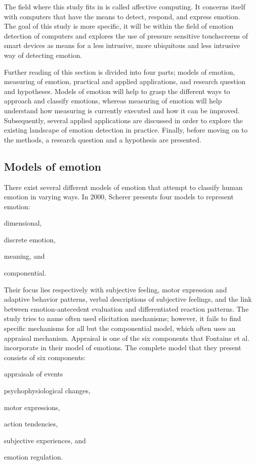 \documentclass{sigchi}
\begin{document}
The field where this study fits in is called affective computing. It concerns itself with computers that have the means to detect, respond, and express emotion. The goal of this study is more specific, it will be within the field of emotion detection of computers and explores the use of pressure sensitive touchscreens of smart devices as means for a less intrusive, more ubiquitous and less intrusive way of detecting emotion.

Further reading of this section is divided into four parts; models of emotion, measuring of emotion, practical and applied applications, and research question and hypotheses. Models of emotion will help to grasp the different ways to approach and classify emotions, whereas measuring of emotion will help understand how measuring is currently executed and how it can be improved. Subsequently, several applied applications are discussed in order to explore the existing landscape of emotion detection in practice. Finally, before moving on to the methods, a research question and a hypothesis are presented.

\subsection{Models of emotion} %
\label{sub:models_of_emotion}
There exist several different models of emotion that attempt to classify human emotion in varying ways. In 2000, Scherer \cite{scherer2000} presents four models to represent emotion:
\begin{enumerate*}[label=(\alph*)]
  \item dimensional,
  \item discrete emotion,
  \item meaning, and
  \item componential.
\end{enumerate*}
Their focus lies respectively with subjective feeling, motor expression and adaptive behavior patterns, verbal descriptions of subjective feelings, and the link between emotion-antecedent evaluation and differentiated reaction patterns. The study tries to name often used elicitation mechanisms; however, it fails to find specific mechanisms for all but the componential model, which often uses an appraisal mechanism. Appraisal is one of the six components that Fontaine et al. \cite{Fontaine2007} incorporate in their model of emotions. The complete model that they present consists of six components:
\begin{enumerate*}[label=(\alph*)]
  \item appraisals of events
  \item psychophysiological changes,
  \item motor expressions,
  \item action tendencies,
  \item subjective experiences, and
  \item emotion regulation.
\end{enumerate*}
\end{document}
